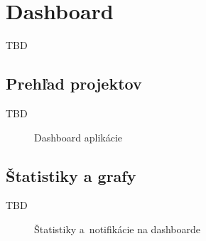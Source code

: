 \chapter{Dashboard}

        TBD

\section{Prehľad projektov}

 TBD

\begin{figure}[H]
  \centering
  \caption{Dashboard aplikácie}
  \label{fig:dashboard_hlavny}
\end{figure}

\section{Štatistiky a grafy}

        TBD

\begin{figure}[H]
  \centering
  \caption{Štatistiky a~notifikácie na dashboarde}
  \label{fig:dashboard_statistiky}
\end{figure}
